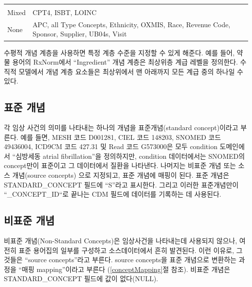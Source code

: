 \documentclass[11pt]{book}
\theoremstyle{definition}
\theoremstyle{definition}
\theoremstyle{definition}
\theoremstyle{remark}
\begin{document}
\begin{longtable}[]{@{}ll@{}}
\begin{minipage}[t]{0.47\columnwidth}
\end{minipage}\tabularnewline
\begin{minipage}[t]{0.13\columnwidth}\raggedright\strut
Mixed\strut
\end{minipage} & \begin{minipage}[t]{0.47\columnwidth}\raggedright\strut
CPT4, ISBT, LOINC\strut
\end{minipage}\tabularnewline
\begin{minipage}[t]{0.13\columnwidth}\raggedright\strut
None\strut
\end{minipage} & \begin{minipage}[t]{0.47\columnwidth}\raggedright\strut
APC, all Type Concepts, Ethnicity, OXMIS, Race, Revenue Code, Sponsor,
Supplier, UB04s, Visit\strut
\end{minipage}\tabularnewline
\bottomrule
\end{longtable}

수평적 개념 계층을 사용하면 특정 계층 수준을 지정할 수 있게 해준다. 예를
들어, 약물 용어의 RxNorm에서 ``Ingredient'' 개념 계층은 최상위층 계급
레벨을 정의한다. 수직적 모델에서 개념 계층 요소들은 최상위에서 맨
아래까지 모든 계급 중의 하나일 수 있다.

\subsection{표준 개념}\label{standardConcepts}

각 임상 사건의 의미를 나타내는 하나의 개념을 표준개념(standard
concept)이라고 부른다. 예를 들면, MESH 코드 D001281, CIEL 코드 148203,
SNOMED 코드 49436004, ICD9CM 코드 427.31 및 Read 코드 G573000은 모두
condition 도메인에서 ``심방세동 atrial fibrillation''을 정의하지만,
condition 데이터에서는 SNOMED의 concept만이 표준이고 그 데이터에서
질환을 나타낸다. 나머지는 비표준 개념 또는 소스 개념(source concepts)
으로 지정되고, 표준 개념에 매핑이 된다. 표준 개념은 STANDARD\_CONCEPT
필드에 ``S''라고 표시한다. 그리고 이러한 표준개념만이
``\_CONCEPT\_ID``로 끝나는 CDM 필드에 데이터를 기록하는 데 사용된다.

\subsection{비표준 개념}\label{-}

비표준 개념(Non-Standard Concepts)은 임상사건을 나타내는데 사용되지
않으나, 여전히 표준 용어집의 일부를 구성하고 소스데이터에서 흔히
발견된다. 이런 이유로, 그것들은 ``source concepts''라고 부른다. source
concepts을 표준 개념으로 변환하는 과정을 ``매핑 mapping''이라고 부른다
(\ref{conceptMapping}절 참조). 비표준 개념은 STANDARD\_CONCEPT 필드에
값이 없다(NULL).
\end{document}
